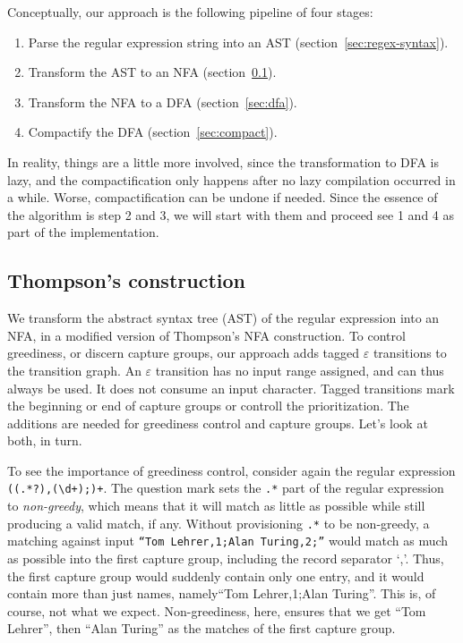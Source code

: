 \documentclass[english,twocolumn]{article}
\theoremstyle{definition}
\newcommand{\Secref}[1]{section~\ref{sec:#1}}
\newcommand{\seclabel}[1]{\label{sec:#1}}
\begin{document}
Conceptually, our approach is the following pipeline of four stages:
\begin{enumerate}
  \item Parse the regular expression string into an AST (\Secref{regex-syntax}).
  \item Transform the AST to an NFA (\Secref{thompson}).
  \item Transform the NFA to a DFA (\Secref{dfa}).
  \item Compactify the DFA (\Secref{compact}).
\end{enumerate}

In reality, things are a little more involved, since the transformation
to DFA is lazy, and the compactification only happens after no lazy
compilation occurred in a while. Worse, compactification can be
undone if needed. Since the essence of the algorithm is step 2 and 3, 
we will start with them and proceed see 1 and 4 as part of the implementation.

\subsection{Thompson's construction} 	\seclabel{thompson}

We transform the abstract syntax tree (AST) of the regular expression into an NFA,
in a modified version of Thompson's NFA construction. To
control greediness, or discern capture groups, our approach adds tagged
$\varepsilon$ transitions to the transition graph. An
$\varepsilon$ transition has no input range assigned, and can thus always
be used. It does not consume an input character. Tagged transitions 
mark the beginning or end of capture groups or controll the prioritization.
The additions are needed for greediness control and capture groups.
Let's look at both, in turn.

To see the importance of greediness control, consider again the regular
expression \texttt{((.*?),(\textbackslash{}d+);)+}. The question
mark sets the \texttt{.*} part of the regular expression to
\emph{non-greedy}, which means that it will match as little as
possible while still producing a valid match, if any.  Without
provisioning \texttt{.*} to be non-greedy, a matching against input
\texttt{``Tom Lehrer,1;Alan Turing,2;''} would match as much as
possible into the first capture group, including the record separator
`,'.  Thus, the first capture group would suddenly contain only one
entry, and it would contain more than just names, namely``Tom
Lehrer,1;Alan Turing''.  This is, of course, not what we expect.
Non-greediness, here, ensures that we get ``Tom Lehrer'', then
``Alan Turing'' as the matches of the first capture group.
\end{document}
